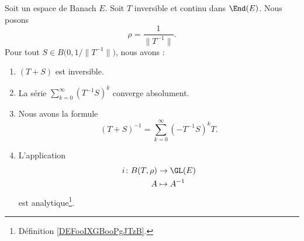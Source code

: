 \begin{proposition}	\label{PROPooCHTEooWWzSqK}
	Soit un espace de Banach \( E\). Soit \( T\) inversible et continu dans \( \End(E)\). Nous posons
	\begin{equation}
		\rho=\frac{1}{ \| T^{-1} \|}.
	\end{equation}
	Pour tout \( S\in B\big( 0,1/\| T^{-1} \| \big)\), nous avons :
	\begin{enumerate}
		\item
		      \( (T+S)\) est inversible.
		\item
		      La série \( \sum_{k=0}^{\infty}(T^{-1}S)^k\) converge absolument.
		\item
		      Nous avons la formule
		      \begin{equation}
			      (T+S)^{-1}=\sum_{k=0}^{\infty}(-T^{-1}S)^kT.
		      \end{equation}
		\item
		      L'application
		      \begin{equation}
			      \begin{aligned}
				      i\colon B(T,\rho) & \to \GL(E)     \\
				      A                 & \mapsto A^{-1}
			      \end{aligned}
		      \end{equation}
		      est analytique\footnote{Définition \ref{DEFooIXGBooPgJTzB}.}.
	\end{enumerate}
\end{proposition}

